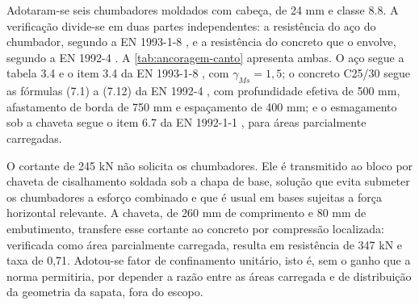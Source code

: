 Adotaram-se seis chumbadores moldados com cabeça, de 24 mm e classe 8.8. A
verificação divide-se em duas partes independentes: a resistência do aço do
chumbador, segundo a EN 1993-1-8 \cite{EN1993-1-8:2005}, e a resistência do
concreto que o envolve, segundo a EN 1992-4 \cite{EN1992-4:2018}. A
\autoref{tab:ancoragem-canto} apresenta ambas. O aço segue a tabela 3.4 e o item
3.4 da EN 1993-1-8 \cite{EN1993-1-8:2005}, com $\gamma_{Ms} = 1{,}5$; o concreto
C25/30 segue as fórmulas (7.1) a (7.12) da EN 1992-4 \cite{EN1992-4:2018}, com
profundidade efetiva de 500 mm, afastamento de borda de 750 mm e espaçamento de
400 mm; e o esmagamento sob a chaveta segue o item 6.7 da
EN 1992-1-1 \cite{EN1992-1-1:2004}, para áreas parcialmente carregadas.


O cortante de 245 kN não solicita os chumbadores. Ele é transmitido ao bloco
por chaveta de cisalhamento soldada sob a chapa de base, solução que evita
submeter os chumbadores a esforço combinado e que é usual em bases sujeitas a
força horizontal relevante. A chaveta, de 260 mm de comprimento e 80 mm de
embutimento, transfere esse cortante ao concreto por compressão localizada:
verificada como área parcialmente carregada, resulta em resistência de
347 kN e taxa de 0,71. Adotou-se fator de confinamento unitário, isto é, sem
o ganho que a norma permitiria, por depender a razão entre as áreas carregada e
de distribuição da geometria da sapata, fora do escopo.

